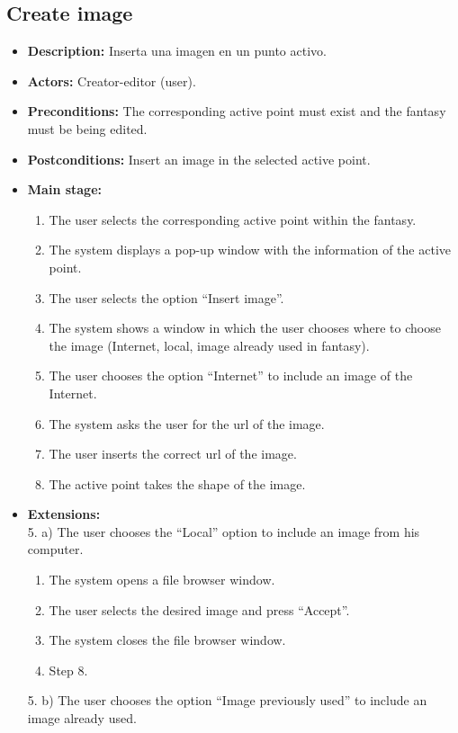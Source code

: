\subsection{Create image}
\begin{itemize}
	\item \textbf{Description:} Inserta una imagen en un punto activo.
	\item \textbf{Actors:} Creator-editor (user).
	\item \textbf{Preconditions:} The corresponding active point must exist and the fantasy must be being edited.
	\item \textbf{Postconditions:} Insert an image in the selected active point.
	\item \textbf{Main stage:}
	\begin{enumerate}
		\item The user selects the corresponding active point within the fantasy.
		\item The system displays a pop-up window with the information of the active point.
		\item The user selects the option ``Insert image''.
		\item The system shows a window in which the user chooses where to choose the image (Internet, local, image already used in fantasy).
		\item The user chooses the option ``Internet'' to include an image of the Internet.
		\item The system asks the user for the url of the image.
		\item The user inserts the correct url of the image.
		\item The active point takes the shape of the image.
	\end{enumerate}
	\item \textbf{Extensions:} \\5. a) The user chooses the ``Local'' option to include an image from his computer.
	\begin{enumerate}
		\item The system opens a file browser window.
		\item The user selects the desired image and press ``Accept''.
		\item The system closes the file browser window.
		\item Step 8.
	\end{enumerate}
	5. b) The user chooses the option ``Image previously used'' to include an image already used.
	\begin{enumerate}

\end{enumerate}
\end{itemize}
